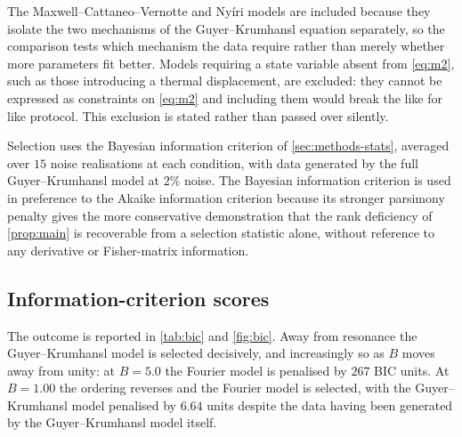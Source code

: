 \documentclass[preprint,12pt,a4paper]{elsarticle}
\theoremstyle{plain}
\theoremstyle{definition}
\theoremstyle{remark}
\newcommand{\Bnum}{B}
\begin{document}
The Maxwell--Cattaneo--Vernotte and Nyíri models are included because they
isolate the two mechanisms of the Guyer--Krumhansl equation separately, so the
comparison tests which mechanism the data require rather than merely whether
more parameters fit better. Models requiring a state variable absent from
\eqref{eq:m2}, such as those introducing a thermal displacement, are excluded:
they cannot be expressed as constraints on \eqref{eq:m2} and including them
would break the like for like protocol. This exclusion is stated rather than
passed over silently.

Selection uses the Bayesian information criterion of \cref{sec:methods-stats},
averaged over $15$ noise realisations at each condition, with data generated by
the full Guyer--Krumhansl model at $2\%$ noise. The Bayesian information
criterion is used in preference to the Akaike information criterion because
its stronger parsimony penalty gives the more conservative demonstration that
the rank deficiency of \cref{prop:main} is recoverable from a selection
statistic alone, without reference to any derivative or Fisher-matrix
information.

\subsection{Information-criterion scores}
\label{sec:ms-results}

The outcome is reported in \cref{tab:bic} and \cref{fig:bic}. Away from resonance the Guyer--Krumhansl
model is selected decisively, and increasingly so as $\Bnum$ moves away from
unity: at $\Bnum = 5.0$ the Fourier model is penalised by $267$ BIC units. At
$\Bnum = 1.00$ the ordering reverses and the Fourier model is selected, with
the Guyer--Krumhansl model penalised by $6.64$ units despite the data having
been generated by the Guyer--Krumhansl model itself.
\end{document}
